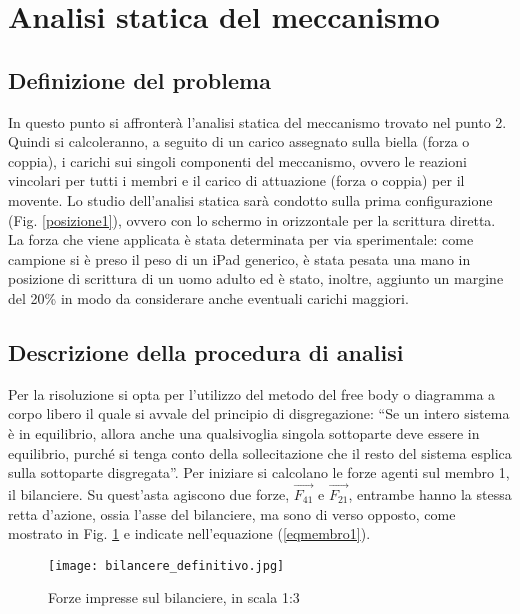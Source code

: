\documentclass{article}
\begin{document}
\section{Analisi statica del meccanismo}
\subsection{Definizione del problema}
In questo punto si affronterà l’analisi statica del meccanismo trovato nel punto 2.
Quindi si calcoleranno, a seguito di un carico assegnato sulla biella (forza o coppia), i carichi sui singoli componenti del meccanismo, ovvero le reazioni vincolari per tutti i membri e il carico di attuazione (forza o coppia) per il movente.
Lo studio dell’analisi statica sarà condotto sulla prima configurazione (Fig. \ref{posizione1}), ovvero con lo schermo in orizzontale per la scrittura diretta.
La forza che viene applicata è stata determinata per via sperimentale: come campione si è preso il peso di un iPad generico, è stata pesata una mano in posizione di scrittura di un uomo adulto ed è stato, inoltre, aggiunto un margine del 20\% in modo da considerare anche eventuali carichi maggiori.

\subsection{Descrizione della procedura di analisi}
Per la risoluzione si opta per l’utilizzo del metodo del free body o diagramma a corpo libero il quale si avvale del principio di disgregazione: “Se un intero sistema è in equilibrio, allora anche una qualsivoglia singola sottoparte deve essere in equilibrio, purché si tenga conto della sollecitazione che il resto del sistema esplica sulla sottoparte disgregata”.
Per iniziare si calcolano le forze agenti sul membro 1, il bilanciere. Su quest’asta agiscono due forze, $\Vec{F_{41}}$ e $\vec{F_{21}}$, entrambe hanno la stessa retta d’azione, ossia l’asse del bilanciere, ma sono di verso opposto, come mostrato in Fig. \ref{bilanciere} e indicate nell’equazione (\ref{eqmembro1}).
\begin{figure} [h!]
    \centering
    \texttt{[image: bilancere\_definitivo.jpg]}
    \caption{Forze impresse sul bilanciere, in scala 1:3}
    \label{bilanciere}
\end{figure}
\end{document}
